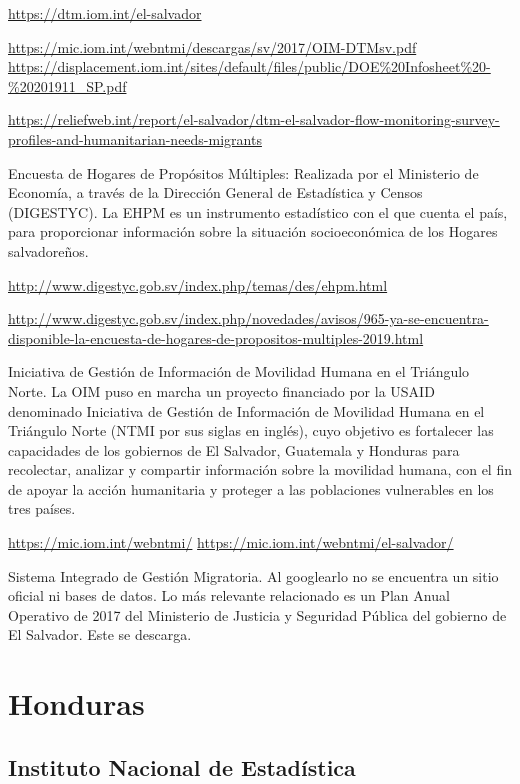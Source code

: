 \documentclass[
]{book}
\begin{document}
\url{https://dtm.iom.int/el-salvador}

\url{https://mic.iom.int/webntmi/descargas/sv/2017/OIM-DTMsv.pdf}
\url{https://displacement.iom.int/sites/default/files/public/DOE\%20Infosheet\%20-\%20201911_SP.pdf}

\url{https://reliefweb.int/report/el-salvador/dtm-el-salvador-flow-monitoring-survey-profiles-and-humanitarian-needs-migrants}

Encuesta de Hogares de Propósitos Múltiples: Realizada por el Ministerio de Economía, a través de la Dirección General de Estadística y Censos (DIGESTYC).
La EHPM es un instrumento estadístico con el que cuenta el país, para proporcionar información sobre la situación socioeconómica de los Hogares salvadoreños.

\url{http://www.digestyc.gob.sv/index.php/temas/des/ehpm.html}

\url{http://www.digestyc.gob.sv/index.php/novedades/avisos/965-ya-se-encuentra-disponible-la-encuesta-de-hogares-de-propositos-multiples-2019.html}

Iniciativa de Gestión de Información de Movilidad Humana en el Triángulo Norte. La OIM puso en marcha un proyecto financiado por la USAID denominado Iniciativa de Gestión de Información de Movilidad Humana en el Triángulo Norte (NTMI por sus siglas en inglés), cuyo objetivo es fortalecer las capacidades de los gobiernos de El Salvador, Guatemala y Honduras para recolectar, analizar y compartir información sobre la movilidad humana, con el fin de apoyar la acción humanitaria y proteger a las poblaciones vulnerables en los tres países.

\url{https://mic.iom.int/webntmi/}
\url{https://mic.iom.int/webntmi/el-salvador/}

Sistema Integrado de Gestión Migratoria. Al googlearlo no se encuentra un sitio oficial ni bases de datos. Lo más relevante relacionado es un Plan Anual Operativo de 2017 del Ministerio de Justicia y Seguridad Pública del gobierno de El Salvador. Este se descarga.

\hypertarget{honduras}{%
\section{Honduras}\label{honduras}}

\hypertarget{instituto-nacional-de-estaduxedstica}{%
\subsection{Instituto Nacional de Estadística}\label{instituto-nacional-de-estaduxedstica}}
\end{document}
